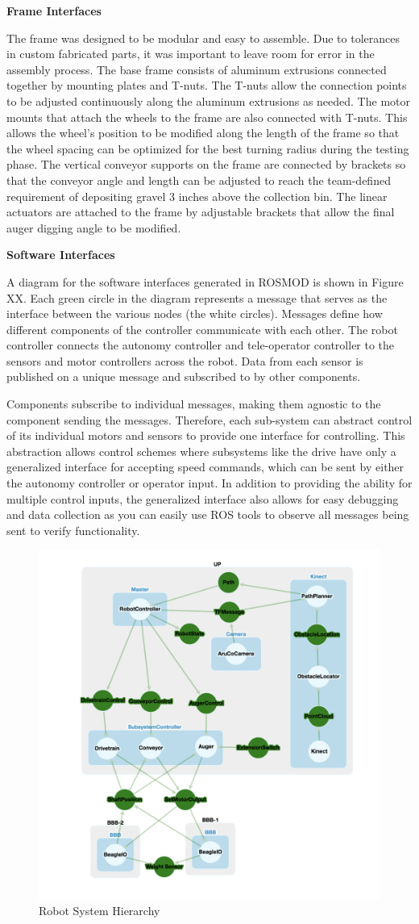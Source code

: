 \documentclass[class=article, crop=false]{standalone}
\begin{document}
	\textbf{Frame Interfaces}
	
	The frame was designed to be modular and easy to assemble. Due to tolerances in custom fabricated parts, it was important to leave room for error in the assembly process. The base frame consists of aluminum extrusions connected together by mounting plates and T-nuts. The T-nuts allow the connection points to be adjusted continuously along the aluminum extrusions as needed. The motor mounts that attach the wheels to the frame are also connected with T-nuts. This allows the wheel’s position to be modified along the length of the frame so that the wheel spacing can be optimized for the best turning radius during the testing phase. The vertical conveyor supports on the frame are connected by brackets so that the conveyor angle and length can be adjusted to reach the team-defined requirement of depositing gravel 3 inches above the collection bin. The linear actuators are attached to the frame by adjustable brackets that allow the final auger digging angle to be modified. 
	
		
	
	
	\textbf{Software Interfaces}
	
		A diagram for the software interfaces generated in ROSMOD is shown in Figure XX. Each green circle in the diagram represents a message that serves as the interface between the various nodes (the white circles). Messages define how different components of the controller communicate with each other. The robot controller connects the autonomy controller and tele-operator controller to the sensors and motor controllers across the robot. Data from each sensor is published on a unique message and subscribed to by other components. 
		
Components subscribe to individual messages, making them agnostic to the component sending the messages. Therefore, each sub-system can abstract control of its individual motors and sensors to provide one interface for controlling. This abstraction allows control schemes where subsystems like the drive have only a generalized interface for accepting speed commands, which can be sent by either the autonomy controller or operator input. In addition to providing the ability for multiple control inputs, the generalized interface also allows for easy debugging and data collection as you can easily use ROS tools to observe all messages being sent to verify functionality.

		\FloatBarrier
		\begin{figure}[h]
			\centering
			\includegraphics[width=0.5\linewidth]{09_Figures/programming_interfaces.png}
			\caption{Robot System Hierarchy}
			\label{fig:programming_interfaces}
		\end{figure}
		\FloatBarrier



	
	
\end{document}
